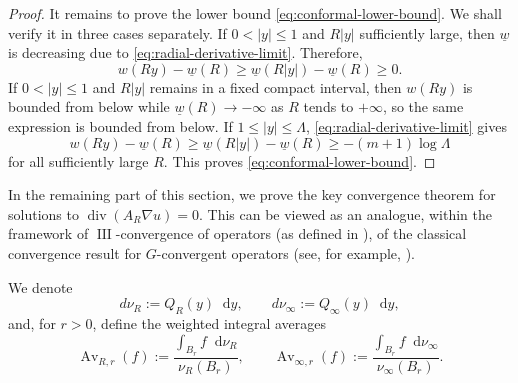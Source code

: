\documentclass[12pt]{amsart}
\theoremstyle{plain}
\theoremstyle{definition}
\theoremstyle{remark}     %
\numberwithin{equation}{section}
\newcommand{\dd}{\mathop{}\!\mathrm{d}}%
\begin{document}
\begin{proof}
It remains to prove the lower bound \cref{eq:conformal-lower-bound}. We shall verify it in three cases separately.
If $0<|y|\leq 1$ and $R|y|$ sufficiently large, then $\underline{w}$ is decreasing due to \cref{eq:radial-derivative-limit}. Therefore, 
\[
   w(Ry)-\underline{w}(R)
   \geq \underline w(R|y|)-\underline w(R)
   \geq0.
\]
If $0<|y|\leq 1$ and $R|y|$ remains in a fixed compact interval, then $w(Ry)$ is bounded
from below while $\underline w(R)\to-\infty$ as $R$ tends to $+\infty$, so the same expression is bounded from below.
If $1\leq |y|\leq\Lambda$,
\cref{eq:radial-derivative-limit} gives
\[
    w(Ry)-\underline{w}(R)\geq
    \underline w(R|y|)-\underline w(R)
    \geq-(m+1)\log\Lambda
\]
for all sufficiently large $R$.  This proves
\cref{eq:conformal-lower-bound}.
\end{proof}

{In the remaining part of this section, we prove the key convergence theorem for solutions to  $\operatorname{div}(A_R\nabla u)=0$.
This can be viewed as an analogue, within the framework of $\operatorname{III}$-convergence of operators (as defined in \cite[Page 76]{ZKON}), of the classical convergence result for $G$-convergent operators (see, for example, \cite[(iv) in page 220]{L}).}

We denote
\[
    d\nu_R:=Q_R(y)\dd y,
    \qquad
    d\nu_\infty:=Q_\infty(y)\dd y,
\]
and, for $r>0$, define the weighted integral averages
\[
    \operatorname{Av}_{R,r}(f)
    :=\frac{\displaystyle\int_{B_r}f\dd\nu_R}
            {\displaystyle\nu_R(B_r)},
    \qquad
    \operatorname{Av}_{\infty,r}(f)
    :=\frac{\displaystyle\int_{B_r}f\dd\nu_\infty}
            {\displaystyle\nu_\infty(B_r)}.
\]
\end{document}
